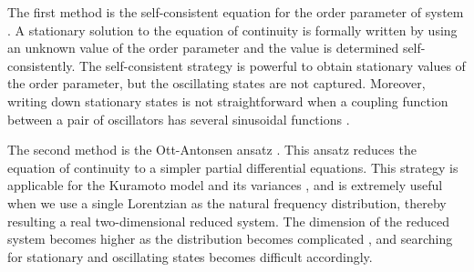 The first method is the self-consistent equation for the order parameter
of system \cite{kuramoto1975,strogatz2000,pazo-05,basnarkov-urumov-07,park-kahng-19}.
A stationary solution to the equation of continuity
is formally written by using an unknown value of the order parameter
and the value is determined self-consistently.
The self-consistent strategy is powerful to obtain
stationary values of the order parameter,
but the oscillating states are not captured.
Moreover, writing down stationary states is not straightforward
when a coupling function between a pair of oscillators
has several sinusoidal functions
\cite{komarov-pikovsky-13,komarov-pikovsky-14}.



The second method is the Ott-Antonsen ansatz \cite{oa2008,oa2009}.
  This ansatz reduces the equation of continuity
  to a simpler partial differential equations.
  This strategy is applicable for the Kuramoto model
  and its variances \cite{lu-etal-16,akao-19},
  and is extremely useful when we use a single Lorentzian
  as the natural frequency distribution,
  thereby resulting a real two-dimensional reduced system.
The dimension of the reduced system becomes higher
as the distribution becomes complicated
\cite{martens2009,terada2017,bastian-18},
and searching for stationary and oscillating states becomes difficult
accordingly.

